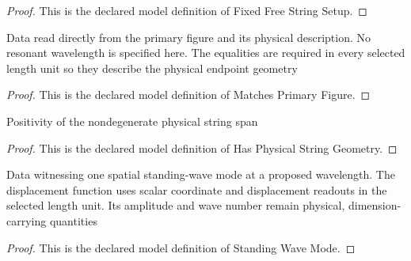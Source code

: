 \begin{proof}
  This is the declared model definition of Fixed Free String Setup.
\end{proof}
\begin{definition}
  \label{def:physics:phyx-mini-0208:phyxminiproblems-problemphyxmini0208-matchesprimaryfigure}
  Data read directly from the primary figure and its physical description. No resonant wavelength is specified here. The equalities are required in every selected length unit so they describe the physical endpoint geometry
\end{definition}
\begin{proof}
  This is the declared model definition of Matches Primary Figure.
\end{proof}
\begin{definition}
  \label{def:physics:phyx-mini-0208:phyxminiproblems-problemphyxmini0208-hasphysicalstringgeometry}
  Positivity of the nondegenerate physical string span
\end{definition}
\begin{proof}
  This is the declared model definition of Has Physical String Geometry.
\end{proof}
\begin{definition}
  \label{def:physics:phyx-mini-0208:phyxminiproblems-problemphyxmini0208-standingwavemode}
  Data witnessing one spatial standing-wave mode at a proposed wavelength. The displacement function uses scalar coordinate and displacement readouts in the selected length unit. Its amplitude and wave number remain physical, dimension-carrying quantities
\end{definition}
\begin{proof}
  This is the declared model definition of Standing Wave Mode.
\end{proof}

